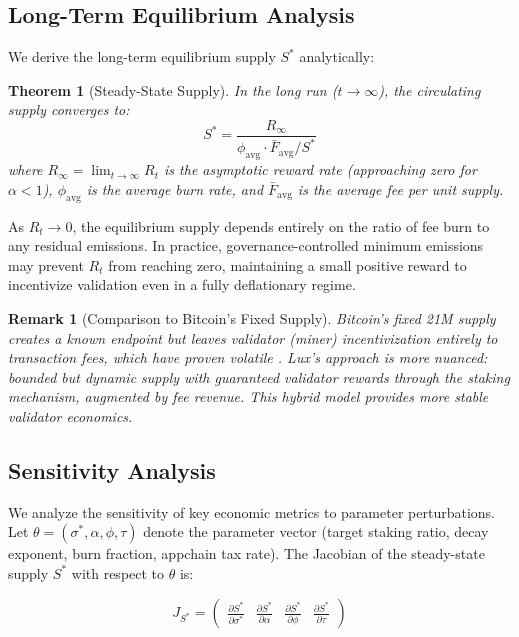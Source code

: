 \documentclass[11pt,a4paper]{article}
\newtheorem{theorem}{Theorem}
\newtheorem{remark}{Remark}
\begin{document}
\subsection{Long-Term Equilibrium Analysis}

We derive the long-term equilibrium supply $S^*$ analytically:

\begin{theorem}[Steady-State Supply]
In the long run ($t \to \infty$), the circulating supply converges to:
\begin{equation}
    S^* = \frac{R_{\infty}}{\phi_{\text{avg}} \cdot \bar{F}_{\text{avg}} / S^*}
\end{equation}
where $R_{\infty} = \lim_{t \to \infty} R_t$ is the asymptotic reward rate (approaching zero for $\alpha < 1$), $\phi_{\text{avg}}$ is the average burn rate, and $\bar{F}_{\text{avg}}$ is the average fee per unit supply.
\end{theorem}

As $R_t \to 0$, the equilibrium supply depends entirely on the ratio of fee burn to any residual emissions. In practice, governance-controlled minimum emissions may prevent $R_t$ from reaching zero, maintaining a small positive reward to incentivize validation even in a fully deflationary regime.

\begin{remark}[Comparison to Bitcoin's Fixed Supply]
Bitcoin's fixed 21M supply creates a known endpoint but leaves validator (miner) incentivization entirely to transaction fees, which have proven volatile \cite{easley2019mining}. Lux's approach is more nuanced: bounded but dynamic supply with guaranteed validator rewards through the staking mechanism, augmented by fee revenue. This hybrid model provides more stable validator economics.
\end{remark}

\subsection{Sensitivity Analysis}

We analyze the sensitivity of key economic metrics to parameter perturbations. Let $\theta = (\sigma^*, \alpha, \phi, \tau)$ denote the parameter vector (target staking ratio, decay exponent, burn fraction, appchain tax rate). The Jacobian of the steady-state supply $S^*$ with respect to $\theta$ is:

\begin{equation}
    J_{S^*} = \begin{pmatrix} \frac{\partial S^*}{\partial \sigma^*} & \frac{\partial S^*}{\partial \alpha} & \frac{\partial S^*}{\partial \phi} & \frac{\partial S^*}{\partial \tau} \end{pmatrix}
\end{equation}
\end{document}
